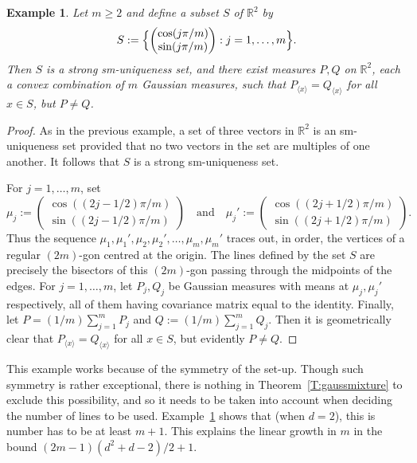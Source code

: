 \documentclass[11pt]{amsart}
\theoremstyle{plain}
\newtheorem{example}[theorem]{Example}
\theoremstyle{remark}
\newcommand{\RR}{\mathbb{R}}
\begin{document}
\begin{example}\label{Ex:m>1}
Let $m\ge2$ and define a subset $S$ of $\RR^2$ by
\[
S:=\Bigl\{\begin{pmatrix}
\cos(j\pi/m)\\
\sin(j\pi/m)
\end{pmatrix}: 
j=1,\dots,m
\Bigr\}.
\]
Then $S$ is a strong sm-uniqueness set,
and there exist measures $P,Q$ on $\RR^2$, each a convex combination
of $m$ Gaussian measures, such that $P_{\langle x\rangle}=Q_{\langle x\rangle}$ for all $x\in S$, but $P\ne Q$.
\end{example}

\begin{proof}
As in the previous example,
a set of three vectors in $\RR^2$ is an sm-uniqueness set
provided that no two vectors in the set are multiples of one another.
It follows that $S$ is a strong sm-uniqueness set.

For $j=1,\dots,m$, set 
\[
\mu_j:=
\begin{pmatrix}
\cos((2j-1/2)\pi/m)\\
\sin((2j-1/2)\pi/m)
\end{pmatrix}
\quad\text{and}\quad
\mu_j':=
\begin{pmatrix}
\cos((2j+1/2)\pi/m)\\
\sin((2j+1/2)\pi/m)
\end{pmatrix}.
\]
Thus the sequence $\mu_1,\mu_1',\mu_2,\mu_2',\dots,\mu_m,\mu_m'$ traces out, in order, the vertices of a  regular $(2m)$-gon
centred at the origin. The lines defined by the set $S$ are precisely
the bisectors of this $(2m)$-gon passing through the midpoints of the edges.
For $j=1,\dots,m$, let $P_j,Q_j$ be  Gaussian measures with means at $\mu_j,\mu_j'$ respectively, all of them having covariance matrix equal to the identity. Finally, let
$P=(1/m)\sum_{j=1}^mP_j$ and $Q:=(1/m)\sum_{j=1}^mQ_j$.
Then it is geometrically clear that $P_{\langle x\rangle}=Q_{\langle x\rangle}$ for all $x\in S$, but evidently $P\ne Q$.
\end{proof}

This example works because of the symmetry
of the set-up. Though such symmetry is rather exceptional, there is
nothing in Theorem~\ref{T:gaussmixture} to exclude this
possibility, and so it needs to be taken into account
when deciding the number of lines to be used. 
Example~\ref{Ex:m>1} shows that (when $d=2$), 
this is number has to be 
at least $m+1$. This explains the linear growth in $m$
in the bound $(2m-1)(d^2+d-2)/2+1$.
\end{document}

